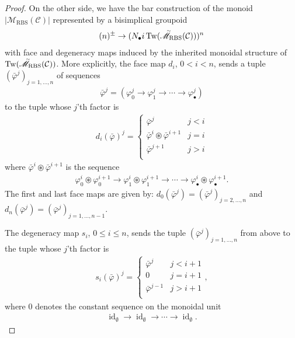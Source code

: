 \documentclass[12pt, reqno]{amsart}
\theoremstyle{plain}
\theoremstyle{definition}
\renewcommand{\phi}{\varphi}
\begin{document}
\begin{proof}
On the other side, we have the bar construction of the monoid $|\mathscr{M}_{\operatorname{RBS}}(\mathcal{C})|$ represented by a bisimplical groupoid
\begin{align*}
(n)^\pm\rightarrow (N_\bullet i\operatorname{Tw}(\accentset{\sim}{\mathscr{M}}_{\operatorname{RBS}}(\mathcal{C})))^n
\end{align*}
with face and degeneracy maps induced by the inherited monoidal structure of $\operatorname{Tw}(\accentset{\sim}{\mathscr{M}}_{\operatorname{RBS}}(\mathcal{C}))$. More explicitly, the face map $d_i$, $0<i<n$, sends a tuple $(\bar{\phi}^j)_{j=1,\ldots,n}$ of sequences
\begin{align*}
\bar{\phi}^j = (\phi^j_0\rightarrow \phi_1^j\rightarrow \cdots \rightarrow \phi_\bullet^j)
\end{align*}
to the tuple whose $j$'th factor is
\begin{align*}
d_i(\bar{\phi})^j=\begin{cases}
\bar{\phi}^j & j<i \\
\bar{\phi}^i\circledast \bar{\phi}^{i+1} & j=i \\
\bar{\phi}^{j+1} & j>i \\
\end{cases}
\end{align*}
where $\bar{\phi}^i\circledast \bar{\phi}^{i+1}$ is the sequence
\begin{align*}
\phi^i_0\circledast \phi^{i+1}_0\rightarrow \phi^i_1\circledast \phi^{i+1}_1\rightarrow \cdots \rightarrow \phi^i_\bullet\circledast \phi^{i+1}_\bullet.
\end{align*}
The first and last face maps are given by: $d_0(\bar{\phi}^j)=(\bar{\phi}^j)_{j=2,\ldots,n}$ and $d_n(\bar{\phi}^j)=(\bar{\phi}^j)_{j=1,\ldots,n-1}$.

The degeneracy map $s_i$, $0\leq i\leq n$, sends the tuple $(\bar{\phi}^j)_{j=1,\ldots,n}$ from above to the tuple whose $j$'th factor is
\begin{align*}
s_i(\bar{\phi})^j=\begin{cases}
\bar{\phi}^j & j<i+1 \\
0 & j=i+1 \\
\bar{\phi}^{j-1} & j>i+1 \\
\end{cases},
\end{align*}
where $0$ denotes the constant sequence on the monoidal unit
\begin{align*}
\operatorname{id}_\emptyset \rightarrow \operatorname{id}_\emptyset\rightarrow \cdots \rightarrow \operatorname{id}_\emptyset.
\end{align*}


\end{proof}
\end{document}
